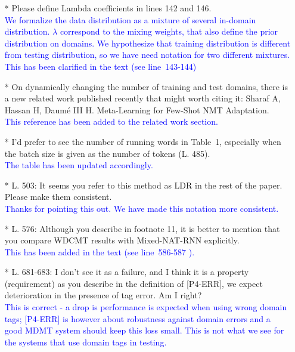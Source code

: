 \documentclass[12pt,times,a4paper,twoside]{article}
\newcommand{\fyTodo}[1]{\Todo[FY:]{\textcolor{orange}{#1}}}
\theoremstyle{definition}
\begin{document}
\begin{itemize}
\item[*] Please define Lambda coefficients in lines 142 and 146.
\\
\textcolor{blue}{We formalize the data distribution as a mixture of several in-domain distribution. $\lambda$ correspond to the mixing weights, that also define the prior distribution on domains. We hypothesize that training distribution is different from testing distribution, so we have need notation for two different mixtures. This has been clarified in the text (see line~143-144) \fyTodo{add lines}}
\\
\item[*] On dynamically changing the number of training and test domains, there is a new related work published recently that might worth citing it: Sharaf A, Hassan H, Daumé III H. Meta-Learning for Few-Shot NMT Adaptation.
\\
\textcolor{blue}{This reference has been added to the related work section.}\fyTodo{Add citation}
\\
\item[*] I’d prefer to see the number of running words in Table~1, especially when the batch size is given as the number of tokens (L. 485).
  \\
  \textcolor{blue}{The table has been updated accordingly.}\fyTodo{to report number of tokens of the datasets}
\\
\item[*] L. 503: It seems you refer to this method as LDR in the rest of the paper. Please make them consistent.
\\
\textcolor{blue}{Thanks for pointing this out. We have made this notation more consistent.}
\\
\item[*] L. 576: Although you describe in footnote 11, it is better to mention that you compare WDCMT results with Mixed-NAT-RNN explicitly.
\\
\textcolor{blue}{This has been added in the text (see line~586-587 ).}\fyTodo{to explicitly compare WDCNMT with Mixed-NAT-RNN. This is in the legend - change presentations ?}
\\
\item[*] L. 681-683: I don’t see it as a failure, and I think it is a property (requirement) as you describe in the definition of [P4-ERR], we expect deterioration in the presence of tag error. Am I right?
\\
\textcolor{blue}{This is correct - a drop is performance is expected when using wrong domain tags; [P4-ERR] is however about robustness against domain errors and a good MDMT system should keep this loss small. This is not what we see for the systems that use domain tags in testing.}


\end{itemize}
\end{document}
